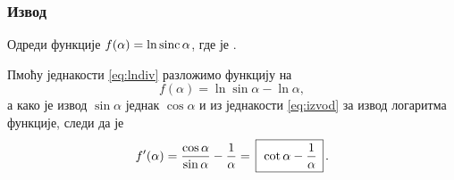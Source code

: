 \subsubsection{Извод}

\def\sinc{\mathop{\rm sinc}}
\zadatak Одреди  функције $f(\alpha)=\ln\sinc\alpha$, где је
\smash{$\displaystyle{\sinc\alpha=\frac{\sin\alpha}{\alpha}}$}.

\resenje Пмоћу једнакости \eqref{eq:lndiv} разложимо функцију на 
$$f(\alpha)=\ln\sin\alpha-\ln\alpha,$$ 
а како је извод $\sin\alpha$ једнак $\cos\alpha$ и из једнакости 
\eqref{eq:izvod} за извод логаритма функције, следи да је
$$
f'(\alpha)
=\frac{\cos\alpha}{\sin\alpha} - \frac1\alpha
=\ram{\cot\alpha - \frac1\alpha}.
$$
